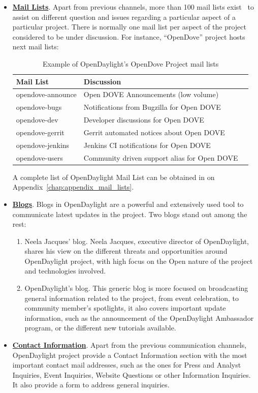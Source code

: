 \documentclass[a4paper, 12pt]{book}
\begin{document}
\begin{itemize}
\item{\textbf{\underline{Mail Lists}}}. Apart from previous channels, more than 100 mail lists exist~\cite{OpenDaylightMailLists} to assist on different question and issues regarding a particular aspect of a particular project. There is normally one mail list per aspect of the project considered to be under discussion. For instance, ``OpenDove'' project hosts next mail lists:
\begin{table}[H]
\footnotesize
\begin{center}
\begin{tabular}{|l|l|l|}
\hline
\textbf{Mail List} & \textbf{Discussion} \\ \hline
opendove-announce	& Open DOVE Announcements (low volume) \\ \hline
opendove-bugs	& Notifications from Bugzilla for Open DOVE \\ \hline
opendove-dev	& Developer discussions for Open DOVE \\ \hline
opendove-gerrit	& Gerrit automated notices about Open DOVE \\ \hline
opendove-jenkins	& Jenkins CI notifications for Open DOVE \\ \hline
opendove-users	& Community driven support alias for Open DOVE \\ \hline
\end{tabular}
\end{center}
\caption{Example of OpenDaylight's OpenDove Project mail lists}
\label{tab:projectmaillist}
\end{table}
A complete list of OpenDaylight Mail List can be obtained in on Appendix~\ref{chap:appendix_mail_lists}.
\item{\textbf{\underline{Blogs}}}. Blogs in OpenDaylight are a powerful and extensively used tool to communicate latest updates in the project. Two blogs stand out among the rest:
\begin{enumerate}
\item{Neela Jacques' blog}. Neela Jacques, executive director of OpenDaylight, shares his view on the different threats and opportunities around OpenDaylight project, with high focus on the Open nature of the project and technologies involved.
\item{OpenDaylight's blog}. This generic blog is more focused on broadcasting general information related to the project, from event celebration, to community member's spotlights, it also covers important update information, such as the announcement of the OpenDaylight Ambassador program, or the different new tutorials available.
\end{enumerate}
\item{\textbf{\underline{Contact Information}}}. Apart from the previous communication channels, OpenDaylight project provide a Contact Information section with the most important contact mail addresses, such as the ones for Press and Analyst Inquiries, Event Inquiries, Website Questions or other Information Inquiries. It also provide a form to address general inquiries.
\end{itemize}
\end{document}
